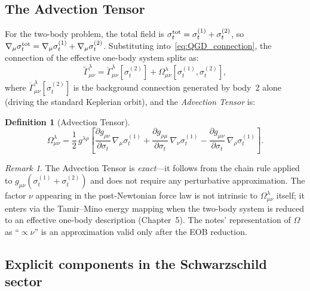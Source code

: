 \documentclass[11pt,a4paper]{article}
\theoremstyle{plain}
\theoremstyle{definition}
\newtheorem{definition}[theorem]{Definition}
\theoremstyle{remark}
\newtheorem{remark}[theorem]{Remark}
\newcommand{\sigt}{\sigma_t}
\begin{document}
\subsection{The Advection Tensor}

For the two-body problem, the total field is $\sigt^{\rm tot} = \sigt^{(1)} + \sigt^{(2)}$,
so $\nabla_\mu\sigt^{\rm tot} = \nabla_\mu\sigt^{(1)} + \nabla_\mu\sigt^{(2)}$.
Substituting into~\eqref{eq:QGD_connection}, the connection of the effective one-body
system splits as:
\begin{equation}
  \widetilde\Gamma^\lambda_{\mu\nu}
  = \mathring\Gamma^\lambda_{\mu\nu}\!\left[\sigt^{(2)}\right]
  + \Omega^\lambda_{\mu\nu}\!\left[\sigt^{(1)},\sigt^{(2)}\right],
  \label{eq:connection_split}
\end{equation}
where $\mathring\Gamma^\lambda_{\mu\nu}[\sigt^{(2)}]$ is the background connection
generated by body~2 alone (driving the standard Keplerian orbit), and the
\emph{Advection Tensor} is:

\begin{definition}[Advection Tensor]
\label{def:advection}
\begin{equation}
  \boxed{
  \Omega^\lambda_{\mu\nu}
  = \frac{1}{2}\,g^{\lambda\rho}
  \!\left[
    \frac{\partial g_{\rho\nu}}{\partial\sigt}\,\nabla_\mu\sigt^{(1)}
  + \frac{\partial g_{\rho\mu}}{\partial\sigt}\,\nabla_\nu\sigt^{(1)}
  - \frac{\partial g_{\mu\nu}}{\partial\sigt}\,\nabla_\rho\sigt^{(1)}
  \right].
  }
  \label{eq:advection}
\end{equation}
\end{definition}

\begin{remark}
The Advection Tensor is \emph{exact}---it follows from the chain rule
applied to $g_{\mu\nu}(\sigt^{(1)} + \sigt^{(2)})$ and does not require any
perturbative approximation.  The factor $\nu$ appearing in the post-Newtonian force
law is not intrinsic to $\Omega^\lambda_{\mu\nu}$ itself; it enters via the
Tamir--Mino energy mapping when the two-body system is reduced to an effective
one-body description (Chapter~5).  The notes' representation of $\Omega$ as
``$\propto \nu$'' is an approximation valid only after the EOB reduction.
\end{remark}

\subsection{Explicit components in the Schwarzschild sector}
\end{document}
